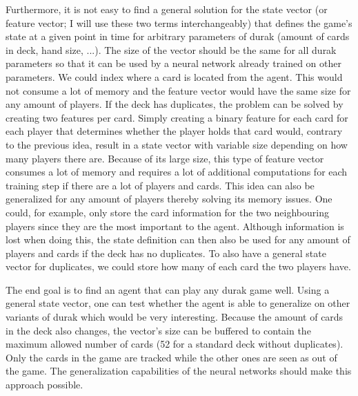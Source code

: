 \documentclass[a4paper,titlepage]{article}
\begin{document}
Furthermore, it is not easy to find a general solution for the state vector (or feature vector; I will use these two terms interchangeably) that defines the game's state at a given point in time for arbitrary parameters of durak (amount of cards in deck, hand size, ...). The size of the vector should be the same for all durak parameters so that it can be used by a neural network already trained on other parameters.
We could index where a card is located from the agent. This would not consume a lot of memory and the feature vector would have the same size for any amount of players. If the deck has duplicates, the problem can be solved by creating two features per card.
Simply creating a binary feature for each card for each player that determines whether the player holds that card would, contrary to the previous idea, result in a state vector with variable size depending on how many players there are. Because of its large size, this type of feature vector consumes a lot of memory and requires a lot of additional computations for each training step if there are a lot of players and cards.
This idea can also be generalized for any amount of players thereby solving its memory issues. One could, for example, only store the card information for the two neighbouring players since they are the most important to the agent. Although information is lost when doing this, the state definition can then also be used for any amount of players and cards if the deck has no duplicates. To also have a general state vector for duplicates, we could store how many of each card the two players have.

The end goal is to find an agent that can play any durak game well. Using a general state vector, one can test whether the agent is able to generalize on other variants of durak which would be very interesting. 
Because the amount of cards in the deck also changes, the vector's size can be buffered to contain the maximum allowed number of cards (52 for a standard deck without duplicates). Only the cards in the game are tracked while the other ones are seen as out of the game. The generalization capabilities of the neural networks should make this approach possible.
\end{document}

